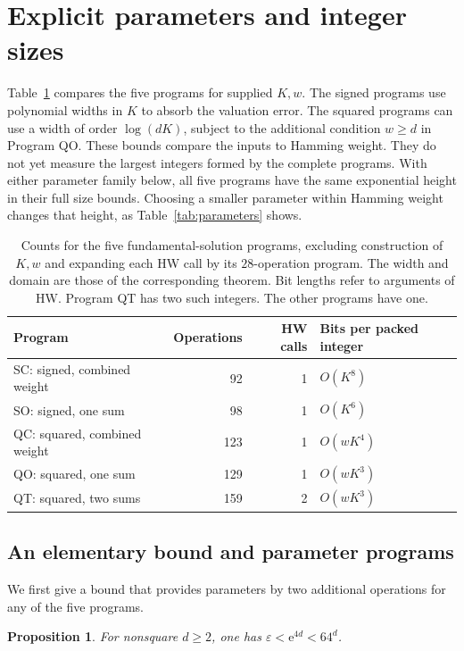 \documentclass[11pt]{article}
\newtheorem{proposition}[theorem]{Proposition}
\theoremstyle{remark}
\newcommand{\eps}{\varepsilon}
\begin{document}
\section{Explicit parameters and integer sizes}\label{sec:parameters}

Table~\ref{tab:cores} compares the five programs for supplied $K,w$.
The signed programs use polynomial widths in $K$ to absorb the valuation
error. The squared programs can use a width of order $\log(dK)$,
subject to the additional condition $w\ge d$ in Program QO.
These bounds compare the inputs to Hamming weight. They do not yet
measure the largest integers formed by the complete programs. With either
parameter family below, all five programs have the same exponential
height in their full size bounds. Choosing a smaller parameter within
Hamming weight changes that height, as Table~\ref{tab:parameters} shows.

\begin{table}[htbp]
\centering
\small
\begin{tabular}{@{}lrrl@{}}
\toprule
Program & Operations & HW calls & Bits per packed integer\\
\midrule
SC: signed, combined weight &92&1&$O(K^8)$\\
SO: signed, one sum &98&1&$O(K^6)$\\
QC: squared, combined weight &123&1&$O(wK^4)$\\
QO: squared, one sum &129&1&$O(wK^3)$\\
QT: squared, two sums &159&2&$O(wK^3)$\\
\bottomrule
\end{tabular}
\caption{Counts for the five fundamental-solution programs, excluding
construction of $K,w$ and expanding each HW call by its $28$-operation
program. The width and domain are those of the corresponding theorem.
Bit lengths refer to arguments of HW. Program QT has two such integers.
The other programs have one.}
\label{tab:cores}
\end{table}

\subsection{An elementary bound and parameter programs}

We first give a bound that provides parameters by two additional
operations for any of the five programs.

\begin{proposition}\label{prop:elementary}
For nonsquare $d\ge2$, one has $\eps<\mathrm e^{4d}<64^d$.
\end{proposition}
\end{document}
